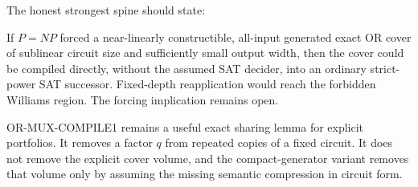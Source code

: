 \documentclass[11pt]{article}
\begin{document}
The honest strongest spine should state:
\begin{resultbox}
If $P=NP$ forced a near-linearly constructible, all-input generated exact OR
cover of sublinear circuit size and sufficiently small output width, then the
cover could be compiled directly, without the assumed SAT decider, into an
ordinary strict-power SAT successor.  Fixed-depth reapplication would reach
the forbidden Williams region.  The forcing implication remains open.
\end{resultbox}

OR-MUX-COMPILE1 remains a useful exact sharing lemma for explicit portfolios.
It removes a factor $q$ from repeated copies of a fixed circuit.  It does not
remove the explicit cover volume, and the compact-generator variant removes
that volume only by assuming the missing semantic compression in circuit
form.

\end{document}
